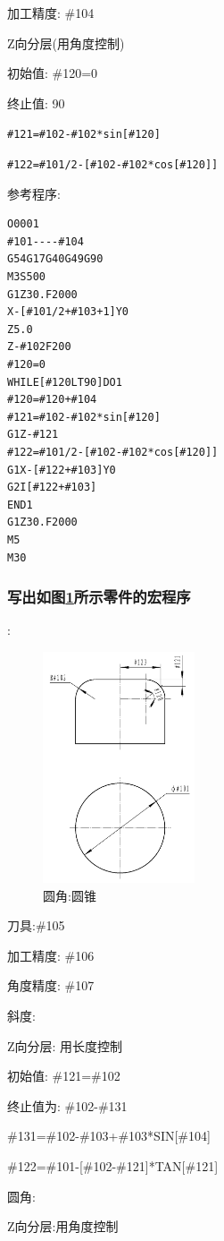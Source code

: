 加工精度: \#104

Z向分层(用角度控制)

初始值: \#120=0

终止值: 90

\verb|#121=#102-#102*sin[#120]|

\verb|#122=#101/2-[#102-#102*cos[#120]]|

参考程序:
\begin{lstlisting}
O0001
#101----#104
G54G17G40G49G90
M3S500
G1Z30.F2000
X-[#101/2+#103+1]Y0
Z5.0
Z-#102F200
#120=0
WHILE[#120LT90]DO1
#120=#120+#104
#121=#102-#102*sin[#120]
G1Z-#121
#122=#101/2-[#102-#102*cos[#120]]
G1X-[#122+#103]Y0
G2I[#122+#103]
END1
G1Z30.F2000
M5
M30
\end{lstlisting}
\subsubsection{写出如图\ref{圆角:圆锥}所示零件的宏程序}:
\begin{figure}
	\centering	\includegraphics[width=0.4\textwidth]{images/13-2.jpg}
	\caption{圆角:圆锥} \label{圆角:圆锥}
\end{figure}
刀具:\#105

加工精度: \#106

角度精度: \#107

斜度:

Z向分层: 用长度控制

初始值: \#121=\#102

终止值为: \#102-\#131

\#131=\#102-\#103+\#103*SIN[\#104]

\#122=\#101-[\#102-\#121]*TAN[\#121]

圆角:

Z向分层:用角度控制

